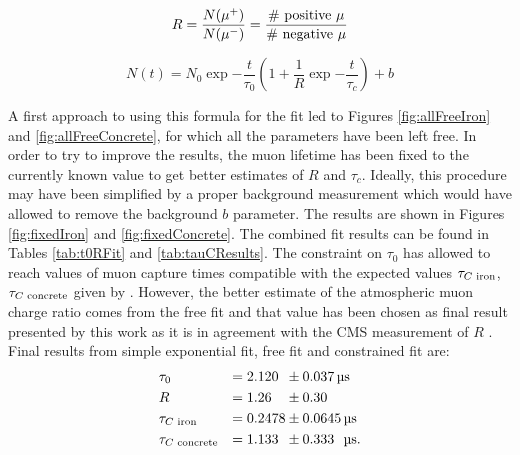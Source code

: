 \documentclass[../main.tex]{subfiles}
\begin{document}
\begin{equation}
\label{eq:r}
    R = \frac{N(\mu^+)}{N(\mu^-)} = \frac{\textnormal{\# positive }\mu}{\textnormal{\# negative }\mu}
\end{equation}

\begin{equation}
\label{eq:finalFit}
    N(t) = N_0 \exp{-\frac{t}{\tau_0}}(1+\frac{1}{R}\exp{-\frac{t}{\tau_c}})+b
\end{equation}

A first approach to using this formula for the fit led to Figures \ref{fig:allFreeIron} and \ref{fig:allFreeConcrete}, for which all the parameters have been left free. In order to try to improve the results, the muon lifetime has been fixed to the currently known value to get better estimates of $R$ and $\tau_c$. Ideally, this procedure may have been simplified by a proper background measurement which would have allowed to remove the background $b$ parameter. The results are shown in Figures \ref{fig:fixedIron} and \ref{fig:fixedConcrete}. The combined fit results can be found in Tables \ref{tab:t0RFit} and \ref{tab:tauCResults}. The constraint on $\tau_0$ has allowed to reach values of muon capture times compatible with the expected values $\tau_{C\textnormal{ iron}}$, $\tau_{C\textnormal{ concrete}}$ given by \cite{nayel2018characterisation,suzuki1987total}. However, the better estimate of the atmospheric muon charge ratio comes from the free fit and that value has been chosen as final result presented by this work as it is in agreement with the CMS measurement of $R$ \cite{khachatryan2010measurement}. Final results from simple exponential fit, free fit and constrained fit are:
\begin{alignat*}{3}
    &\tau_0 &=2.120\phantom{0}&\pm 0.037\, \si{\micro \second} \\
    &R & =1.26\phantom{00}&\pm 0.30\phantom{0} \\
    &\tau_{C\textnormal{ iron}} & =0.2478&\pm 0.0645\, \si{\micro \second} \\
    &\tau_{C\textnormal{ concrete}} & =1.133\phantom{0}&\pm 0.333\phantom{0}\, \si{\micro \second}.
\end{alignat*}
\end{document}
